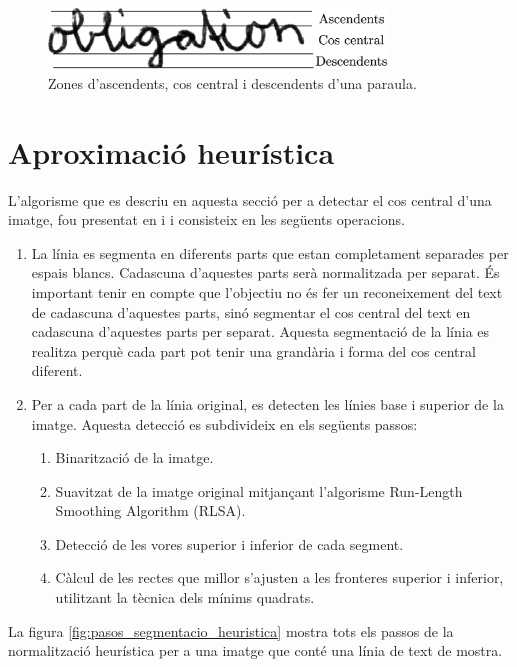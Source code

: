 \begin{figure}
\centering
\includegraphics[width=0.8\textwidth]{images/ascendents_descendents_central.eps}
\caption{Zones d'ascendents, cos central i descendents d'una paraula. \cite{Pastor07}}\label{fig:ascendents_descendents_central}
\end{figure}

\section{Aproximació heurística}
\label{sec:seg_heur}
L'algorisme que es descriu en aquesta secció per a detectar el cos central d'una imatge, fou presentat en \cite{Romero05} i \cite{Pastor07} i consisteix en les següents operacions.
\begin{enumerate}
\item La línia es segmenta en diferents parts que estan completament separades per espais blancs. Cadascuna d'aquestes parts serà normalitzada per separat. És important tenir en compte que l'objectiu no és fer un reconeixement del text de cadascuna d'aquestes parts, sinó segmentar el cos central del text en cadascuna d'aquestes parts per separat. Aquesta segmentació de la línia es realitza perquè cada part pot tenir una grandària i forma del cos central diferent.
\item Per a cada part de la línia original, es detecten les línies base i superior de la imatge. Aquesta detecció es subdivideix en els següents passos:
\begin{enumerate}
\item Binarització de la imatge.
\item Suavitzat de la imatge original mitjançant l'algorisme Run-Length Smoothing Algorithm (RLSA).
\item Detecció de les vores superior i inferior de cada segment.
\item Càlcul de les rectes que millor s'ajusten a les fronteres superior i inferior, utilitzant la tècnica dels mínims quadrats.
\end{enumerate}
\end{enumerate}

La figura \ref{fig:pasos_segmentacio_heuristica} mostra tots els passos de la normalització heurística per a una imatge que conté una línia de text de mostra.\\

